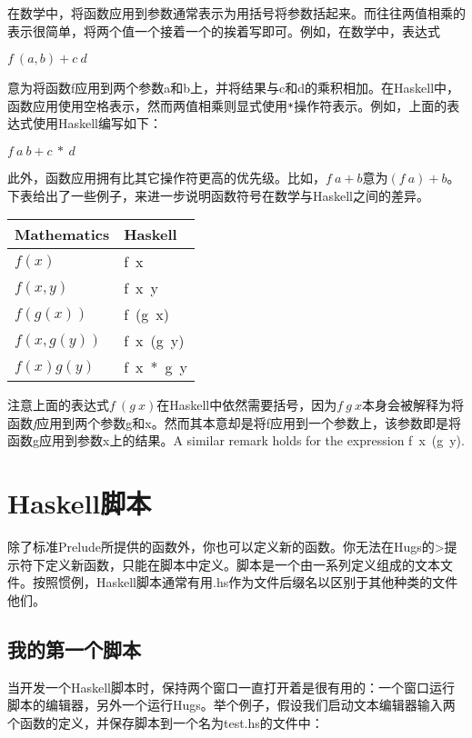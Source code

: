 在数学中，将函数应用到参数通常表示为用括号将参数括起来。而往往两值相乘的表示很简单，将两个值一个接着一个的挨着写即可。例如，在数学中，表达式

\noindent\hspace*{1cm} $f~(a, b) + c~ d$

意为将函数f应用到两个参数a和b上，并将结果与c和d的乘积相加。在Haskell中，函数应用使用空格表示，然而两值相乘则显式使用\verb|*|操作符表示。例如，上面的表达式使用Haskell编写如下：

\noindent\hspace*{1cm} $f~a~b + c~*~d$

此外，函数应用拥有比其它操作符更高的优先级。比如，$f~a + b$意为$(f~a) +
b$。下表给出了一些例子，来进一步说明函数符号在数学与Haskell之间的差异。

\begin{table}[htbp]
\label{tab:threesome}
\centering
\begin{tabular}{ll}
\hline
Mathematics & Haskell  \\
\hline
$f(x)$ & f~x \\
$f(x,y)$ & f~x~y \\
$f(g(x))$ & f~(g~x) \\
$f(x,g(y))$ & f~x~(g~y)\\
$f(x)g(y)$ & f~x~*~g~y\\
\hline
\end{tabular}
\end{table}

注意上面的表达式$f~(g~x)$在Haskell中依然需要括号，因为$f~g~
x$本身会被解释为将函数\textit{f}应用到两个参数g和x。然而其本意却是将f应用到一个参数上，该参数即是将函数g应用到参数x上的结果。A similar remark holds for the expression f~x~(g~y).

\section{Haskell脚本}
除了标准Prelude所提供的函数外，你也可以定义新的函数。你无法在Hugs的>提示符下定义新函数，只能在脚本中定义。脚本是一个由一系列定义组成的文本文件。按照惯例，Haskell脚本通常有用.hs作为文件后缀名以区别于其他种类的文件他们。

\subsection{我的第一个脚本}
当开发一个Haskell脚本时，保持两个窗口一直打开着是很有用的：一个窗口运行脚本的编辑器，另外一个运行Hugs。举个例子，假设我们启动文本编辑器输入两个函数的定义，并保存脚本到一个名为test.hs的文件中：

